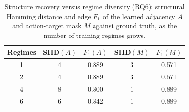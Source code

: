 \begin{table}[t]
\caption{Structure recovery versus regime diversity (RQ6): structural
Hamming distance and edge $F_1$ of the learned adjacency $A$ and
action-target mask $M$ against ground truth, as the number of training
regimes grows.}\label{tab:rq6}
\begin{tabular}{ccccc}
\toprule
Regimes & SHD$(A)$ & $F_1(A)$ & SHD$(M)$ & $F_1(M)$\\
\midrule
1 & 4 & 0.889 & 3 & 0.571 \\
2 & 4 & 0.889 & 3 & 0.571 \\
4 & 8 & 0.800 & 1 & 0.889 \\
6 & 6 & 0.842 & 1 & 0.889 \\
\bottomrule
\end{tabular}
\end{table}
